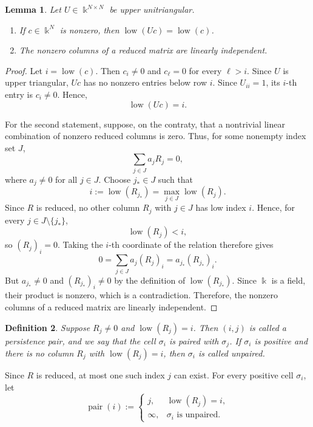 \documentclass[11pt]{article}
\theoremstyle{paperdefinition}
\newtheorem{definition}{Definition}[section]
\theoremstyle{paperplain}
\newtheorem{lemma}[definition]{Lemma}
\theoremstyle{paperremark}
\begin{document}
\begin{lemma}
\label{lem:reduced-matrix-facts}
Let $U\in\Bbbk^{N\times N}$ be upper unitriangular.
\begin{enumerate}
\item If $c\in\Bbbk^N$ is nonzero, then $\operatorname{low}(Uc)=\operatorname{low}(c)$.
\item The nonzero columns of a reduced matrix are linearly independent.
\end{enumerate}
\end{lemma}

\begin{proof}
Let $i=\operatorname{low}(c)$. Then $c_i\neq0$ and $c_\ell=0$ for every $\ell>i$. Since $U$ is upper triangular, $Uc$ has no nonzero entries below row $i$. Since $U_{ii}=1$, its $i$-th entry is $c_i\neq0$. Hence,
\[
\operatorname{low}(Uc)=i.
\]

For the second statement, suppose, on the contraty, that a nontrivial linear combination of nonzero reduced columns is zero. Thus, for some nonempty index set $J$,
\[
\sum_{j\in J} a_j R_j = 0,
\]
where $a_j\neq 0$ for all $j\in J$. Choose $j_*\in J$ such that
\[
i:=\operatorname{low}(R_{j_*}) = \max_{j\in J}\operatorname{low}(R_j).
\]
Since $R$ is reduced, no other column $R_j$ with $j\in J$ has low index $i$. Hence, for every $j\in J\setminus\{j_*\}$,
\[
\operatorname{low}(R_j)<i,
\]
so $(R_j)_i=0$. Taking the $i$-th coordinate of the relation therefore gives
\[
0 = \sum_{j\in J} a_j(R_j)_i = a_{j_*}(R_{j_*})_i.
\]
But $a_{j_*}\neq0$ and $(R_{j_*})_i\neq0$ by the definition of $\operatorname{low}(R_{j_*})$. Since $\Bbbk$ is a field, their product is nonzero, which is a contradiction. Therefore, the nonzero columns of a reduced matrix are linearly independent.
\end{proof}

\begin{definition}
\label{def:reduction-pair}
Suppose $R_j\neq0$ and $\operatorname{low}(R_j)=i$. Then $(i,j)$ is called a \emph{persistence pair}, and we say that the cell $\sigma_i$ is \emph{paired} with $\sigma_j$. If $\sigma_i$ is positive and there is no column $R_j$ with $\operatorname{low}(R_j)=i$, then $\sigma_i$ is called \emph{unpaired}.
\end{definition}

Since $R$ is reduced, at most one such index $j$ can exist. For every positive cell $\sigma_i$, let
\[
\operatorname{pair}(i) :=
\begin{cases}
j,&\operatorname{low}(R_j)=i,\\
\infty,&\sigma_i\text{ is unpaired}.
\end{cases}
\]
\end{document}

